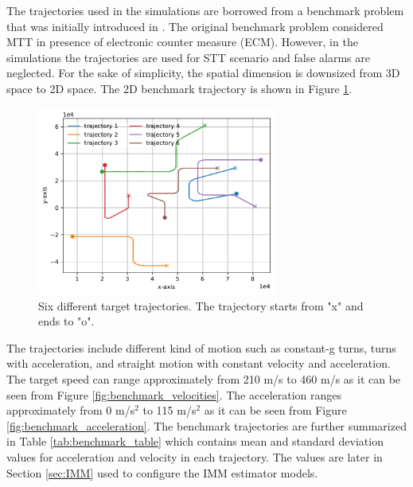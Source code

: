 \documentclass[english, 12pt, a4paper, elec, utf8, a-1b, online]{aaltothesis}
\begin{document}
The trajectories used in the simulations are borrowed from a benchmark problem that was initially introduced in \cite{Blair1998}.
The original benchmark problem considered MTT in presence of electronic counter measure (ECM).
However, in the simulations the trajectories are used for STT scenario and false alarms are neglected.
For the sake of simplicity, the spatial dimension is downsized from 3D space to 2D space.
The 2D benchmark trajectory is shown in Figure \ref{fig:benchmark_trajectories}.
\begin{figure}[tb]
    \centering
    \includegraphics[width=0.7\textwidth]{figures/benchmark/trajectories.pdf}
    \caption{Six different target trajectories. The trajectory starts from "x" and ends to "o".}
    \label{fig:benchmark_trajectories}
\end{figure}
The trajectories include different kind of motion such as constant-g turns, turns with acceleration, and straight motion with constant velocity and  acceleration.
The target speed can range approximately from 210 m/s to 460 m/s as it can be seen from Figure \ref{fig:benchmark_velocities}.
The acceleration ranges approximately from 0 m/s$^2$ to 115 m/s$^2$ as it can be seen from Figure \ref{fig:benchmark_acceleration}.
The benchmark trajectories are further summarized in Table \ref{tab:benchmark_table} which contains mean and standard deviation values for acceleration and velocity in each trajectory.
The values are later in Section \ref{sec:IMM} used to configure the IMM estimator models. 
\end{document}
